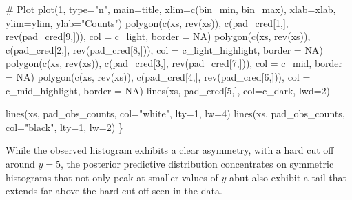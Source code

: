 \documentclass[
  letterpaper,
  DIV=11,
  numbers=noendperiod]{scrartcl}
\newenvironment{Shaded}{\begin{snugshade}}{\end{snugshade}}
\newcommand{\AttributeTok}[1]{\textcolor[rgb]{0.40,0.45,0.13}{#1}}
\newcommand{\CommentTok}[1]{\textcolor[rgb]{0.37,0.37,0.37}{#1}}
\newcommand{\ConstantTok}[1]{\textcolor[rgb]{0.56,0.35,0.01}{#1}}
\newcommand{\DecValTok}[1]{\textcolor[rgb]{0.68,0.00,0.00}{#1}}
\newcommand{\FunctionTok}[1]{\textcolor[rgb]{0.28,0.35,0.67}{#1}}
\newcommand{\NormalTok}[1]{\textcolor[rgb]{0.00,0.23,0.31}{#1}}
\newcommand{\StringTok}[1]{\textcolor[rgb]{0.13,0.47,0.30}{#1}}
\begin{document}
\begin{Shaded}
\begin{Highlighting}[]
  \CommentTok{\# Plot}
  \FunctionTok{plot}\NormalTok{(}\DecValTok{1}\NormalTok{, }\AttributeTok{type=}\StringTok{"n"}\NormalTok{, }\AttributeTok{main=}\NormalTok{title,}
       \AttributeTok{xlim=}\FunctionTok{c}\NormalTok{(bin\_min, bin\_max), }\AttributeTok{xlab=}\NormalTok{xlab,}
       \AttributeTok{ylim=}\NormalTok{ylim, }\AttributeTok{ylab=}\StringTok{"Counts"}\NormalTok{)}
  \FunctionTok{polygon}\NormalTok{(}\FunctionTok{c}\NormalTok{(xs, }\FunctionTok{rev}\NormalTok{(xs)), }\FunctionTok{c}\NormalTok{(pad\_cred[}\DecValTok{1}\NormalTok{,], }\FunctionTok{rev}\NormalTok{(pad\_cred[}\DecValTok{9}\NormalTok{,])),}
          \AttributeTok{col =}\NormalTok{ c\_light, }\AttributeTok{border =} \ConstantTok{NA}\NormalTok{)}
  \FunctionTok{polygon}\NormalTok{(}\FunctionTok{c}\NormalTok{(xs, }\FunctionTok{rev}\NormalTok{(xs)), }\FunctionTok{c}\NormalTok{(pad\_cred[}\DecValTok{2}\NormalTok{,], }\FunctionTok{rev}\NormalTok{(pad\_cred[}\DecValTok{8}\NormalTok{,])),}
          \AttributeTok{col =}\NormalTok{ c\_light\_highlight, }\AttributeTok{border =} \ConstantTok{NA}\NormalTok{)}
  \FunctionTok{polygon}\NormalTok{(}\FunctionTok{c}\NormalTok{(xs, }\FunctionTok{rev}\NormalTok{(xs)), }\FunctionTok{c}\NormalTok{(pad\_cred[}\DecValTok{3}\NormalTok{,], }\FunctionTok{rev}\NormalTok{(pad\_cred[}\DecValTok{7}\NormalTok{,])),}
          \AttributeTok{col =}\NormalTok{ c\_mid, }\AttributeTok{border =} \ConstantTok{NA}\NormalTok{)}
  \FunctionTok{polygon}\NormalTok{(}\FunctionTok{c}\NormalTok{(xs, }\FunctionTok{rev}\NormalTok{(xs)), }\FunctionTok{c}\NormalTok{(pad\_cred[}\DecValTok{4}\NormalTok{,], }\FunctionTok{rev}\NormalTok{(pad\_cred[}\DecValTok{6}\NormalTok{,])),}
          \AttributeTok{col =}\NormalTok{ c\_mid\_highlight, }\AttributeTok{border =} \ConstantTok{NA}\NormalTok{)}
  \FunctionTok{lines}\NormalTok{(xs, pad\_cred[}\DecValTok{5}\NormalTok{,], }\AttributeTok{col=}\NormalTok{c\_dark, }\AttributeTok{lwd=}\DecValTok{2}\NormalTok{)}

  \FunctionTok{lines}\NormalTok{(xs, pad\_obs\_counts, }\AttributeTok{col=}\StringTok{"white"}\NormalTok{, }\AttributeTok{lty=}\DecValTok{1}\NormalTok{, }\AttributeTok{lw=}\DecValTok{4}\NormalTok{)}
  \FunctionTok{lines}\NormalTok{(xs, pad\_obs\_counts, }\AttributeTok{col=}\StringTok{"black"}\NormalTok{, }\AttributeTok{lty=}\DecValTok{1}\NormalTok{, }\AttributeTok{lw=}\DecValTok{2}\NormalTok{)}
\NormalTok{\}}
\end{Highlighting}
\end{Shaded}

While the observed histogram exhibits a clear asymmetry, with a hard cut
off around \(y = 5\), the posterior predictive distribution concentrates
on symmetric histograms that not only peak at smaller values of \(y\)
abut also exhibit a tail that extends far above the hard cut off seen in
the data.
\end{document}

